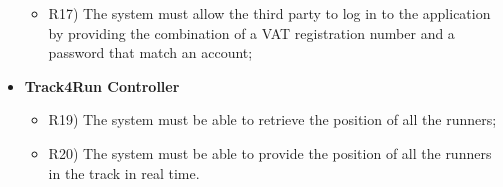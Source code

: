 \begin{itemize}
\begin{itemize}
			\item R17) The system must allow the third party to log in to the application by providing the combination of a VAT registration number and a password that match an account;\\
		\end{itemize}
		\item \textbf{Track4Run Controller}
		\begin{itemize}
			\item R19) The system must be able to retrieve the position of all the runners;\\
			\item R20) The system must be able to provide the position of all the runners in the track in real time.\\

		\end{itemize}
	\end{itemize}
	
